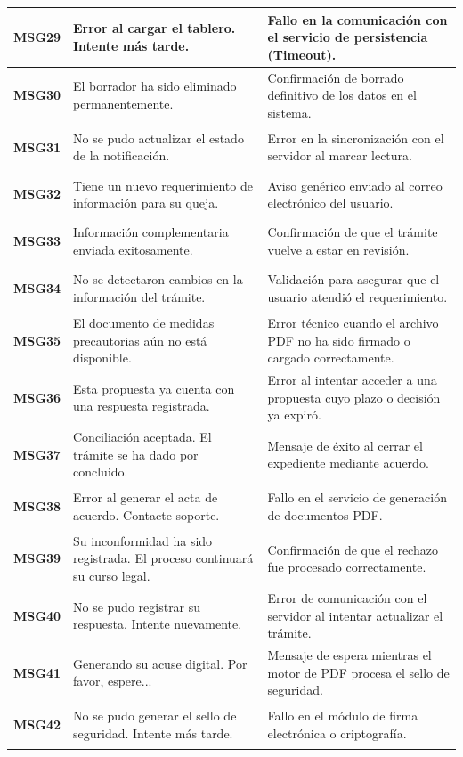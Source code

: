 \begin{longtable}{|p{2cm}|p{6cm}|p{6cm}|}
    \hypertarget{msg:MSG29}{\textbf{MSG29}} & Error al cargar el tablero. Intente más tarde. & Fallo en la comunicación con el servicio de persistencia (Timeout). \\ \hline
    \hypertarget{msg:MSG30}{\textbf{MSG30}} & El borrador ha sido eliminado permanentemente. & Confirmación de borrado definitivo de los datos en el sistema. \\ \hline
    \hypertarget{msg:MSG31}{\textbf{MSG31}} & No se pudo actualizar el estado de la notificación. & Error en la sincronización con el servidor al marcar lectura. \\ \hline
    \hypertarget{msg:MSG32}{\textbf{MSG32}} & Tiene un nuevo requerimiento de información para su queja. & Aviso genérico enviado al correo electrónico del usuario. \\ \hline
    \hypertarget{msg:MSG33}{\textbf{MSG33}} & Información complementaria enviada exitosamente. & Confirmación de que el trámite vuelve a estar en revisión. \\ \hline
    \hypertarget{msg:MSG34}{\textbf{MSG34}} & No se detectaron cambios en la información del trámite. & Validación para asegurar que el usuario atendió el requerimiento. \\ \hline
    \hypertarget{msg:MSG35}{\textbf{MSG35}} & El documento de medidas precautorias aún no está disponible. & Error técnico cuando el archivo PDF no ha sido firmado o cargado correctamente. \\ \hline
    \hypertarget{msg:MSG36}{\textbf{MSG36}} & Esta propuesta ya cuenta con una respuesta registrada. & Error al intentar acceder a una propuesta cuyo plazo o decisión ya expiró. \\ \hline
    \hypertarget{msg:MSG37}{\textbf{MSG37}} & Conciliación aceptada. El trámite se ha dado por concluido. & Mensaje de éxito al cerrar el expediente mediante acuerdo. \\ \hline
    \hypertarget{msg:MSG38}{\textbf{MSG38}} & Error al generar el acta de acuerdo. Contacte soporte. & Fallo en el servicio de generación de documentos PDF. \\ \hline
    \hypertarget{msg:MSG39}{\textbf{MSG39}} & Su inconformidad ha sido registrada. El proceso continuará su curso legal. & Confirmación de que el rechazo fue procesado correctamente. \\ \hline
    \hypertarget{msg:MSG40}{\textbf{MSG40}} & No se pudo registrar su respuesta. Intente nuevamente. & Error de comunicación con el servidor al intentar actualizar el trámite. \\ \hline
    \hypertarget{msg:MSG41}{\textbf{MSG41}} & Generando su acuse digital. Por favor, espere... & Mensaje de espera mientras el motor de PDF procesa el sello de seguridad. \\ \hline
    \hypertarget{msg:MSG42}{\textbf{MSG42}} & No se pudo generar el sello de seguridad. Intente más tarde. & Fallo en el módulo de firma electrónica o criptografía. \\ \hline





\end{longtable}